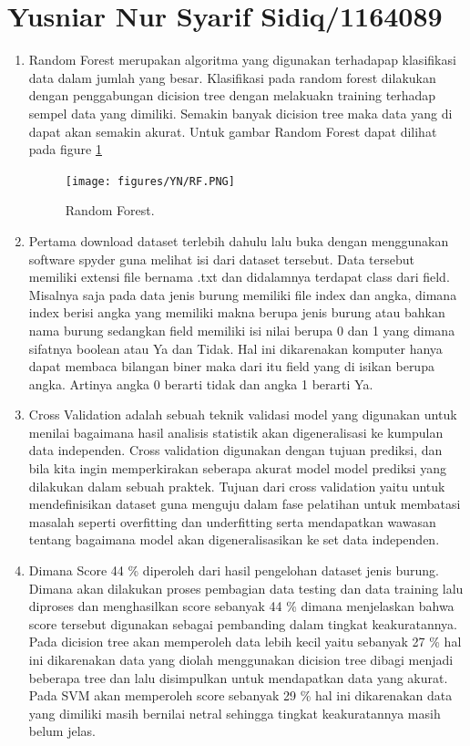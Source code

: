 \section{Yusniar Nur Syarif Sidiq/1164089}
\begin{enumerate}

\item Random Forest merupakan algoritma yang digunakan terhadapap klasifikasi data dalam jumlah yang besar. Klasifikasi pada random forest dilakukan dengan penggabungan dicision tree dengan melakuakn training terhadap sempel data yang dimiliki. Semakin banyak dicision tree maka data yang di dapat akan semakin akurat. Untuk gambar Random Forest dapat dilihat pada figure \ref{YNRF}

	\begin{figure}[ht]
	\centerline{\texttt{[image: figures/YN/RF.PNG]}}
	\caption{Random Forest.}
	\label{YNRF}
	\end{figure}

\item Pertama download dataset terlebih dahulu lalu buka dengan menggunakan software spyder guna melihat isi dari dataset tersebut. Data tersebut memiliki extensi file bernama .txt dan didalamnya terdapat class dari field. Misalnya saja pada data jenis burung memiliki file index dan angka, dimana index berisi angka yang memiliki makna berupa jenis burung atau bahkan nama burung sedangkan field memiliki isi nilai berupa 0 dan 1 yang dimana sifatnya boolean atau Ya dan Tidak. Hal ini dikarenakan komputer hanya dapat membaca bilangan biner maka dari itu field yang di isikan berupa angka. Artinya angka 0 berarti tidak dan angka 1 berarti Ya.

\item Cross Validation adalah sebuah teknik validasi model yang digunakan untuk menilai bagaimana hasil analisis statistik akan digeneralisasi ke kumpulan data independen. Cross validation digunakan dengan tujuan prediksi, dan bila kita ingin memperkirakan seberapa akurat model model prediksi yang dilakukan dalam sebuah praktek. Tujuan dari cross validation yaitu untuk mendefinisikan dataset guna menguju dalam fase pelatihan untuk membatasi masalah seperti overfitting dan underfitting serta mendapatkan wawasan tentang bagaimana model akan digeneralisasikan ke set data independen.

\item Dimana Score 44 \% diperoleh dari hasil pengelohan dataset jenis burung. Dimana akan dilakukan proses pembagian data testing dan data training lalu diproses dan menghasilkan score sebanyak 44 \% dimana menjelaskan bahwa score tersebut digunakan sebagai pembanding dalam tingkat keakuratannya. Pada dicision tree akan memperoleh data lebih kecil yaitu sebanyak 27 \% hal ini dikarenakan data yang diolah menggunakan dicision tree dibagi menjadi beberapa tree dan lalu disimpulkan untuk mendapatkan data yang akurat. Pada SVM akan memperoleh score sebanyak 29 \% hal ini dikarenakan data yang dimiliki masih bernilai netral sehingga tingkat keakuratannya masih belum jelas.


\end{enumerate}
